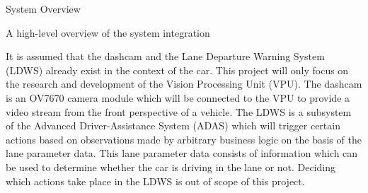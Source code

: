 \documentclass{matthijs}
\begin{document}
\begin{hoofdstuk}{System Overview}
\begin{figuur}{A high-level overview of the system integration}

			\vspace{-1.5ex}

		\end{figuur}

		It is assumed that the dashcam and the Lane Departure Warning System (LDWS) already exist in the context of the car.
		This project will only focus on the research and development of the Vision Processing Unit (VPU).
		The dashcam is an OV7670 camera module which will be connected to the VPU to provide a video stream from the front perspective of a vehicle.
		The LDWS is a subsystem of the Advanced Driver-Assistance System (ADAS) which will trigger certain actions based on observations made by arbitrary business logic on the basis of the lane parameter data.
		This lane parameter data consists of information which can be used to determine whether the car is driving in the lane or not.
		Deciding which actions take place in the LDWS is out of scope of this project.

	\end{hoofdstuk}
\end{document}

